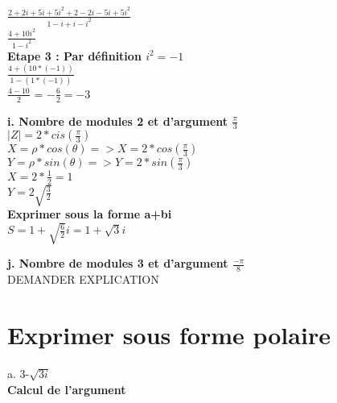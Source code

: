 $\frac{2+2i+5i+5i^{2} + 2-2i-5i+5i^{2} }{1-i+i-i^{2}}$ \\

$\frac{4 + 10i^{2} }{1-i^{2}}$ \\

\textbf{Etape 3 : Par définition $i^{2} = -1$} \\

$\frac{4 + (10*(-1)) }{1-(1*(-1))}$ \\

$\frac{4-10}{2}$ = $-\frac{6}{2} = -3$ \\

\vspace{5mm} %

\textbf{i. Nombre de modules 2 et d'argument $\frac{\pi}{3}$} \\

$|Z| = 2*cis(\frac{\pi}{3})$ \\

$X= \rho * cos(\theta) => X = 2*cos(\frac{\pi}{3})$  \\
$Y = \rho * sin(\theta) => Y = 2*sin(\frac{\pi}{3})$ \\

$X = 2*\frac{1}{2} = 1$ \\
$Y = 2\sqrt{\frac{3}{2}}$ \\

\textbf{Exprimer sous la forme a+bi} \\

$S = 1 + \sqrt{\frac{6}{2}} i = 1 + \sqrt{3} i$ \\

\newpage

\textbf{j. Nombre de modules 3 et d'argument $\frac{-\pi}{8}$} \\

DEMANDER EXPLICATION


\newpage
\vspace{3mm} %
\section{Exprimer sous forme polaire}
\vspace{3mm} %

a. 3-$\sqrt{3i}$ \\

\textbf{Calcul de l'argument} \\
\vspace{3mm} %

